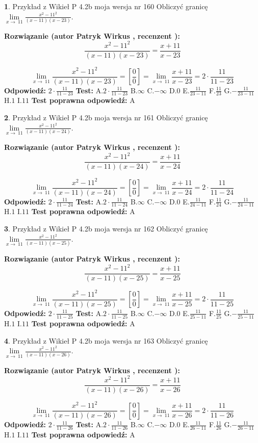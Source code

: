 \documentclass[12pt, a4paper]{article}
\theoremstyle{definition} %
\newtheorem{zad}{}
\newcommand{\zadStart}[1]{\begin{zad}#1\newline}
\newcommand{\zadStop}{\end{zad}}
\newcommand{\rozwStart}[2]{\noindent \textbf{Rozwiązanie (autor #1 , recenzent #2): }\newline}
\newcommand{\rozwStop}{\newline}
\newcommand{\odpStart}{\noindent \textbf{Odpowiedź:}\newline}
\newcommand{\odpStop}{\newline}
\newcommand{\testStart}{\noindent \textbf{Test:}\newline}
\newcommand{\testStop}{\newline}
\newcommand{\kluczStart}{\noindent \textbf{Test poprawna odpowiedź:}\newline}
\newcommand{\kluczStop}{\newline}
\begin{document}
\zadStart{Przykład z Wikieł P 4.2b moja wersja nr 160}
Obliczyć granicę $\lim\limits_{x\to\ 11}\frac{x^{2}-11^{2}}{(x-11)(x-23)}$.
\zadStop
\rozwStart{Patryk Wirkus}{}
$$\frac{x^{2}-11^{2}}{(x-11)(x-23)}=\frac{x+11}{x-23}$$

$$\lim\limits_{x\to\ 11}\frac{x^{2}-11^{2}}{(x-11)(x-23)}=[\frac{0}{0}]=\lim\limits_{x\to\ 11}\frac{x+11}{x-23}=2 \cdot \frac{11}{11-23}$$
\rozwStop
\odpStart
$2 \cdot \frac{11}{11-23}$
\odpStop
\testStart
A.$2 \cdot \frac{11}{11-23}$
B.$\infty$
C.$-\infty$
D.$0$
E.$\frac{11}{23-11}$
F.$\frac{11}{23}$
G.$-\frac{11}{23-11}$
H.$1$
I.$11$
\testStop
\kluczStart
A
\kluczStop



\zadStart{Przykład z Wikieł P 4.2b moja wersja nr 161}
Obliczyć granicę $\lim\limits_{x\to\ 11}\frac{x^{2}-11^{2}}{(x-11)(x-24)}$.
\zadStop
\rozwStart{Patryk Wirkus}{}
$$\frac{x^{2}-11^{2}}{(x-11)(x-24)}=\frac{x+11}{x-24}$$

$$\lim\limits_{x\to\ 11}\frac{x^{2}-11^{2}}{(x-11)(x-24)}=[\frac{0}{0}]=\lim\limits_{x\to\ 11}\frac{x+11}{x-24}=2 \cdot \frac{11}{11-24}$$
\rozwStop
\odpStart
$2 \cdot \frac{11}{11-24}$
\odpStop
\testStart
A.$2 \cdot \frac{11}{11-24}$
B.$\infty$
C.$-\infty$
D.$0$
E.$\frac{11}{24-11}$
F.$\frac{11}{24}$
G.$-\frac{11}{24-11}$
H.$1$
I.$11$
\testStop
\kluczStart
A
\kluczStop



\zadStart{Przykład z Wikieł P 4.2b moja wersja nr 162}
Obliczyć granicę $\lim\limits_{x\to\ 11}\frac{x^{2}-11^{2}}{(x-11)(x-25)}$.
\zadStop
\rozwStart{Patryk Wirkus}{}
$$\frac{x^{2}-11^{2}}{(x-11)(x-25)}=\frac{x+11}{x-25}$$

$$\lim\limits_{x\to\ 11}\frac{x^{2}-11^{2}}{(x-11)(x-25)}=[\frac{0}{0}]=\lim\limits_{x\to\ 11}\frac{x+11}{x-25}=2 \cdot \frac{11}{11-25}$$
\rozwStop
\odpStart
$2 \cdot \frac{11}{11-25}$
\odpStop
\testStart
A.$2 \cdot \frac{11}{11-25}$
B.$\infty$
C.$-\infty$
D.$0$
E.$\frac{11}{25-11}$
F.$\frac{11}{25}$
G.$-\frac{11}{25-11}$
H.$1$
I.$11$
\testStop
\kluczStart
A
\kluczStop



\zadStart{Przykład z Wikieł P 4.2b moja wersja nr 163}
Obliczyć granicę $\lim\limits_{x\to\ 11}\frac{x^{2}-11^{2}}{(x-11)(x-26)}$.
\zadStop
\rozwStart{Patryk Wirkus}{}
$$\frac{x^{2}-11^{2}}{(x-11)(x-26)}=\frac{x+11}{x-26}$$

$$\lim\limits_{x\to\ 11}\frac{x^{2}-11^{2}}{(x-11)(x-26)}=[\frac{0}{0}]=\lim\limits_{x\to\ 11}\frac{x+11}{x-26}=2 \cdot \frac{11}{11-26}$$
\rozwStop
\odpStart
$2 \cdot \frac{11}{11-26}$
\odpStop
\testStart
A.$2 \cdot \frac{11}{11-26}$
B.$\infty$
C.$-\infty$
D.$0$
E.$\frac{11}{26-11}$
F.$\frac{11}{26}$
G.$-\frac{11}{26-11}$
H.$1$
I.$11$
\testStop
\kluczStart
A
\kluczStop
\end{document}

